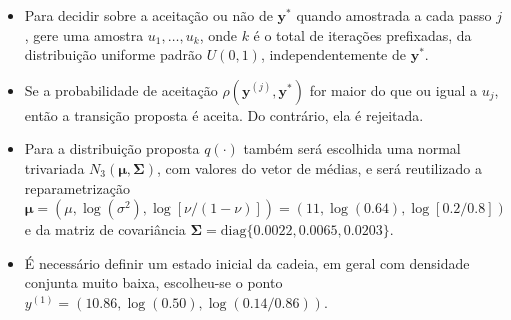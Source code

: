 \documentclass[9pt]{beamer}
\begin{document}
\begin{frame}
\begin{itemize}
\justifying	
\item Para decidir sobre a aceitação ou não de $\bm{y}^*$ quando amostrada a cada passo $j$, gere uma amostra $u_1, \ldots, u_k$, onde $k$ é o total de iterações prefixadas, da distribuição uniforme padrão $U(0,1)$, independentemente de $\bm{y}^*$.
\item Se a probabilidade de aceitação $\rho(\bm{y}^{(j)}, \bm{y}^*)$ for maior do que ou igual a $u_j$, então a transição proposta é aceita. Do contrário, ela é rejeitada.
\item Para a distribuição proposta $q(\cdot)$ também será escolhida uma normal trivariada $N_3(\bm{\mu}, \bm{\Sigma})$, com valores do vetor de médias, e será reutilizado a reparametrização $\bm{\mu} = (\mu, \log(\sigma^2), \log[\nu/(1-\nu)]) = (11, \log(0.64), \log[0.2/0.8])$ e da matriz de covariância $\bm{\Sigma} = \textrm{diag}\{0.0022, 0.0065, 0.0203\}$.
\item É necessário definir um estado inicial da cadeia, em geral com densidade conjunta muito baixa, escolheu-se o ponto $y^{(1)} = (10.86, \log(0.50),\log(0.14/0.86))$. 
\end{itemize}
\end{frame}
\end{document}
